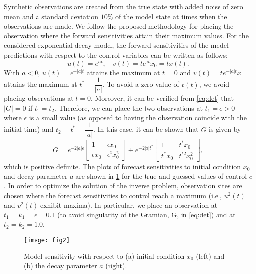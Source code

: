 \documentclass{article}
\begin{document}
Synthetic observations are created from the true state with added noise of zero mean and a standard deviation $10\%$ of the model state at times when the observations are made. We follow the proposed methodology for placing the observation where the forward sensitivities attain their maximum values. For the considered exponential decay model, the forward sensitivities of the model predictions with respect to the control variables can be written as follows:
\begin{equation}
    u(t) = e^{at}, \quad v(t) = t e^{at} x_0 = t x(t).
\end{equation}
With $a < 0$, $u(t) = e^{-|a|t}$ attains the maximum at $t=0$ and $v(t) = te^{-|a|t}x$ attains the maximum at $t^*=\dfrac{1}{|a|}$. To avoid a zero value of $v(t)$, we avoid placing observations at $t=0$. Moreover, it can be verified from \cref{eq:det} that $|G| = 0$ if $t_1=t_2$. Therefore, we can place the two observations at $t_1 = \epsilon > 0$ where $\epsilon$ is a small value (as opposed to having the observation coincide with the initial time) and $t_2=t^*=\dfrac{1}{|a|}$. In this case, it can be shown that $G$ is given by
\begin{equation}
    G = e^{-2|a| \epsilon} \begin{bmatrix} 1 & \epsilon x_0 \\ \epsilon x_0 & \epsilon^2 x_0^2 \end{bmatrix} 
      + e^{-2|a| t^*} \begin{bmatrix} 1 & t^* x_0 \\ t^*x_0 & t^{*2} x_0^2 \end{bmatrix},
\end{equation}
which is positive definite. The plots of forecast sensitivities to initial condition $x_0$ and decay parameter $a$ are shown in \cref{fig:sensitivity} for the true and guessed values of control $c$. In order to optimize the solution of the inverse problem, observation sites are chosen where the forecast sensitivities to control reach a maximum (i.e., $u^2(t)$ and $v^2(t)$ exhibit maxima). In particular, we place an observation at $t_1 = k_1 = \epsilon = 0.1$ (to avoid singularity of the Gramian, G, in \cref{eq:det}) and at $t_2 = k_2 = 1.0$.
\begin{figure}[ht!]
    \centering
    \texttt{[image: fig2]}
    \caption{Model sensitivity with respect to (a) initial condition $x_0$ (left) and (b) the decay parameter $a$ (right).}
    \label{fig:sensitivity}
\end{figure}
\end{document}
